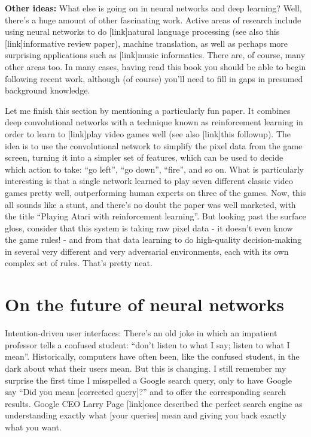 \documentclass[a4paper,twoside,10pt]{book}
\begin{document}
\textbf{Other ideas:} What else is going on in neural networks and deep learning? Well, there's a huge amount of other fascinating work. Active areas of research include using neural networks to do [link]natural language processing (see also this [link]informative review paper), machine translation, as well as perhaps more surprising applications such as [link]music informatics. There are, of course, many other areas too. In many cases, having read this book you should be able to begin following recent work, although (of course) you'll need to fill in gaps in presumed background knowledge.

Let me finish this section by mentioning a particularly fun paper. It combines deep convolutional networks with a technique known as reinforcement learning in order to learn to [link]play video games well (see also [link]this followup). The idea is to use the convolutional network to simplify the pixel data from the game screen, turning it into a simpler set of features, which can be used to decide which action to take: ``go left'', ``go down'', ``fire'', and so on. What is particularly interesting is that a single network learned to play seven different classic video games pretty well, outperforming human experts on three of the games. Now, this all sounds like a stunt, and there's no doubt the paper was well marketed, with the title ``Playing Atari with reinforcement learning''. But looking past the surface gloss, consider that this system is taking raw pixel data - it doesn't even know the game rules! - and from that data learning to do high-quality decision-making in several very different and very adversarial environments, each with its own complex set of rules. That's pretty neat.

\section{On the future of neural networks}
Intention-driven user interfaces: There's an old joke in which an impatient professor tells a confused student: ``don't listen to what I say; listen to what I mean''. Historically, computers have often been, like the confused student, in the dark about what their users mean. But this is changing. I still remember my surprise the first time I misspelled a Google search query, only to have Google say ``Did you mean [corrected query]?'' and to offer the corresponding search results. Google CEO Larry Page [link]once described the perfect search engine as understanding exactly what [your queries] mean and giving you back exactly what you want.
\end{document}
